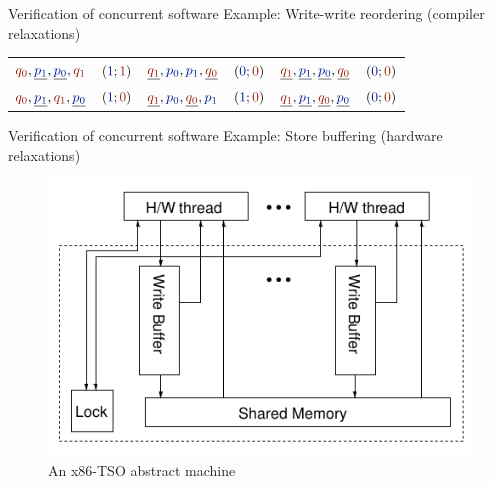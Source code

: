 \documentclass{beamer}
\renewcommand{\r}[1]{\ensuremath{\textcolor{dkred}{#1}}}
\renewcommand{\b}[1]{\ensuremath{\textcolor{dkblue}{#1}}}
\begin{document}
\begin{frame}{Verification of concurrent software} {Example: Write-write reordering (compiler  relaxations)}
\begin{minipage}{.6\textwidth}
\begin{table}
\begin{tabular}{ | l r | l r | l r }
$\r{q_0}, \underline{\b{p_1}}, \underline{\b{p_0}}, \r{q_1}$ & $(\b{1}; \r{1})$  &  $\underline{\r{q_1}}, \b{p_0}, \b{p_1}, \underline{\r{q_0}}$ & $(\b{0}; \r{0})$  &  $\underline{\r{q_1}}, \underline{\b{p_1}}, \underline{\b{p_0}}, \underline{\r{q_0}}$ & $(\b{0}; \r{0})$ \\
$\r{q_0}, \underline{\b{p_1}}, \r{q_1}, \underline{\b{p_0}}$ & $(\b{1}; \r{0})$  &  $\underline{\r{q_1}}, \b{p_0}, \underline{\r{q_0}}, \b{p_1}$ & $(\b{1}; \r{0})$  &  $\underline{\r{q_1}}, \underline{\b{p_1}}, \underline{\r{q_0}}, \underline{\b{p_0}}$ & $(\b{0}; \r{0})$ \\
\end{tabular}
\end{table}
\end{minipage}

\end{frame}



\begin{frame}{Verification of concurrent software} {Example: Store buffering (hardware relaxations)}
\begin{center}
\end{center}

\begin{figure}
\includegraphics[scale=0.37]{img/x86-arch-full.png}
\caption{An x86-TSO abstract machine~\cite{sewell2010x86}}
\end{figure}
\end{frame}
\end{document}
